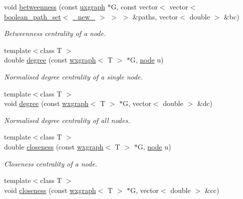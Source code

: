 \begin{DoxyCompactItemize}
void \hyperlink{namespacelgraph_1_1networks_1_1metrics_1_1centralities_aa43468d2f3d108abc26f0844cccb12e5}{betweenness} (const \hyperlink{classlgraph_1_1utils_1_1uxgraph}{uxgraph} $\ast$G, const vector$<$ vector$<$ \hyperlink{namespacelgraph_1_1utils_aaf50131e15d771a45620336d6e7a77f8}{boolean\+\_\+path\+\_\+set}$<$ \hyperlink{namespacelgraph_1_1utils_a2c84bfde888c42ab3ad6b2cb8a364240}{\+\_\+new\+\_\+} $>$ $>$ $>$ \&paths, vector$<$ double $>$ \&bc)
\begin{DoxyCompactList}\small\item\em Betweenness centrality of a node. \end{DoxyCompactList}\item 
{\footnotesize template$<$class T $>$ }\\double \hyperlink{namespacelgraph_1_1networks_1_1metrics_1_1centralities_ab069253de07dc54020e9d6cc1a27a6c8}{degree} (const \hyperlink{classlgraph_1_1utils_1_1wxgraph}{wxgraph}$<$ T $>$ $\ast$G, \hyperlink{namespacelgraph_1_1utils_a7bd66ede3805ef121bc2835bd48de0cf}{node} u)
\begin{DoxyCompactList}\small\item\em Normalised degree centrality of a single node. \end{DoxyCompactList}\item 
{\footnotesize template$<$class T $>$ }\\void \hyperlink{namespacelgraph_1_1networks_1_1metrics_1_1centralities_a9b3eb8bead7056e2be01d1f3dda72428}{degree} (const \hyperlink{classlgraph_1_1utils_1_1wxgraph}{wxgraph}$<$ T $>$ $\ast$G, vector$<$ double $>$ \&dc)
\begin{DoxyCompactList}\small\item\em Normalised degree centrality of all nodes. \end{DoxyCompactList}\item 
{\footnotesize template$<$class T $>$ }\\double \hyperlink{namespacelgraph_1_1networks_1_1metrics_1_1centralities_a641608dcaecba5d3636237bd15da2e96}{closeness} (const \hyperlink{classlgraph_1_1utils_1_1wxgraph}{wxgraph}$<$ T $>$ $\ast$G, \hyperlink{namespacelgraph_1_1utils_a7bd66ede3805ef121bc2835bd48de0cf}{node} u)
\begin{DoxyCompactList}\small\item\em Closeness centrality of a node. \end{DoxyCompactList}\item 
{\footnotesize template$<$class T $>$ }\\void \hyperlink{namespacelgraph_1_1networks_1_1metrics_1_1centralities_a38135be31ba7cef97d70ed68434f5e74}{closeness} (const \hyperlink{classlgraph_1_1utils_1_1wxgraph}{wxgraph}$<$ T $>$ $\ast$G, vector$<$ double $>$ \&cc)

\end{DoxyCompactItemize}

